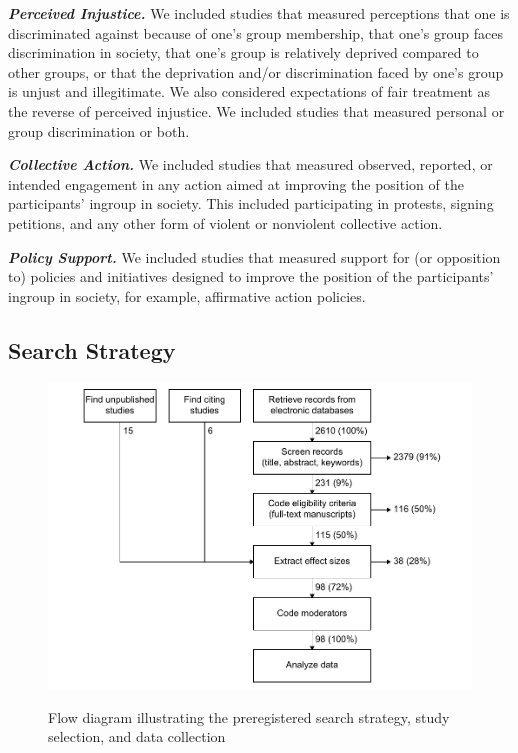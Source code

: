 \documentclass[12pt, letterpaper]{article}
\begin{document}
\textbf{\emph{Perceived Injustice.}} We included studies that measured
perceptions that one is discriminated against because of one's group
membership, that one's group faces discrimination in society, that one's
group is relatively deprived compared to other groups, or that the
deprivation and/or discrimination faced by one's group is unjust and
illegitimate. We also considered expectations of fair treatment as the
reverse of perceived injustice. We included studies that measured
personal or group discrimination or both.

\textbf{\emph{Collective Action.}} We included studies that measured
observed, reported, or intended engagement in any action aimed at
improving the position of the participants' ingroup in society. This
included participating in protests, signing petitions, and any other
form of violent or nonviolent collective action.

\textbf{\emph{Policy Support.}} We included studies that measured
support for (or opposition to) policies and initiatives designed to
improve the position of the participants' ingroup in society, for
example, affirmative action policies.

\hypertarget{search-strategy}{%
\subsection{Search Strategy}\label{search-strategy}}

\begin{figure}[t!]
\centering
\caption{Flow diagram illustrating the preregistered search strategy, study selection, and data collection}
\includegraphics[scale=1]{../figures/figure-1}
\label{fig:f1}
\end{figure}
\end{document}
